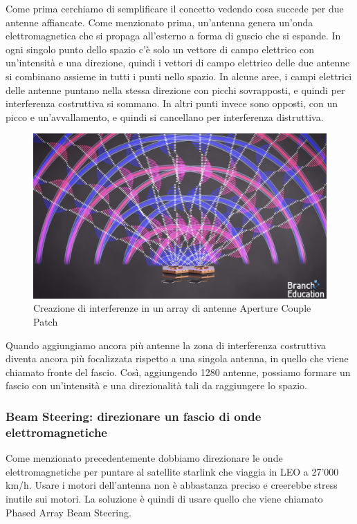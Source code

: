 Come prima cerchiamo di semplificare il concetto vedendo cosa succede per due antenne affiancate.
Come menzionato prima, un'antenna genera un'onda elettromagnetica che si propaga all'esterno a forma di guscio che si espande.
In ogni singolo punto dello spazio c'è solo un vettore di campo elettrico con un'intensità e una direzione, quindi i vettori di campo elettrico delle due antenne si combinano assieme in tutti i punti nello spazio.
In alcune aree, i campi elettrici delle antenne puntano nella stessa direzione con picchi sovrapposti, e quindi per interferenza costruttiva si sommano.
In altri punti invece sono opposti, con un picco e un'avvallamento, e quindi si cancellano per interferenza distruttiva.

\begin{figure}[htbp]
  \centering
  \includegraphics[width=0.8\linewidth]{./res/img/antenna_interference.png}
  \caption{Creazione di interferenze in un array di antenne Aperture Couple Patch \cite{branch_education_how_2022}}
  \label{fig:aperture-couple-patch-antenna-interference}
\end{figure}

Quando aggiungiamo ancora più antenne la zona di interferenza costruttiva diventa ancora più focalizzata rispetto a una singola antenna, in quello che viene chiamato fronte del fascio.
Così, aggiungendo 1280 antenne, possiamo formare un fascio con un'intensità e una direzionalità tali da raggiungere lo spazio.\cite{branch_education_how_2022}


\subsubsection{Beam Steering: direzionare un fascio di onde elettromagnetiche}
Come menzionato precedentemente dobbiamo direzionare le onde elettromagnetiche per puntare al satellite starlink che viaggia in \ac{LEO} a 27'000 km/h.
Usare i motori dell'antenna non è abbastanza preciso e creerebbe stress inutile sui motori.
La soluzione è quindi di usare quello che viene chiamato Phased Array Beam Steering.

